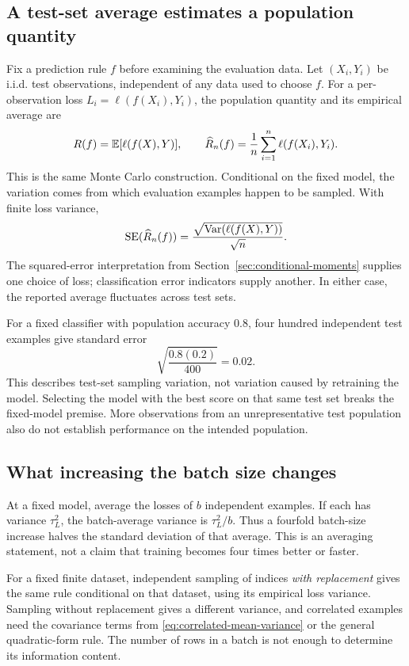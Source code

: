 \subsection{A test-set average estimates a population quantity}

Fix a prediction rule \(f\) before examining the evaluation data.
Let \((X_i,Y_i)\) be i.i.d. test observations, independent of any
data used to choose \(f\). For a per-observation loss
\(L_i=\ell(f(X_i),Y_i)\), the population quantity and its empirical
average are
\[
  R(f)=\mathbb{E}[\ell(f(X),Y)],\qquad
  \widehat R_n(f)=\frac1n\sum_{i=1}^n\ell(f(X_i),Y_i).
\]
This is the same Monte Carlo construction. Conditional on the fixed
model, the variation comes from which evaluation examples happen to
be sampled. With finite loss variance,
\[
  \operatorname{SE}(\widehat R_n(f))
  =\frac{\sqrt{\operatorname{Var}(\ell(f(X),Y))}}{\sqrt n}.
\]
The squared-error interpretation from
Section~\ref{sec:conditional-moments} supplies one choice of loss;
classification error indicators supply another. In either case, the
reported average fluctuates across test sets.

For a fixed classifier with population accuracy \(0.8\), four hundred
independent test examples give standard error
\[
  \sqrt{\frac{0.8(0.2)}{400}}=0.02.
\]
This describes test-set sampling variation,
not variation caused by retraining the model. Selecting the model
with the best score on that same test set breaks the fixed-model
premise. More observations from an unrepresentative test population
also do not establish performance on the intended population.

\subsection{What increasing the batch size changes}

At a fixed model, average the losses of \(b\) independent examples.
If each has variance \(\tau_L^2\), the batch-average variance is
\(\tau_L^2/b\). Thus a fourfold batch-size increase halves the
standard deviation of that average. This is an averaging statement,
not a claim that training becomes four times better or faster.

For a fixed finite dataset, independent sampling of indices
\emph{with replacement} gives the same rule conditional on that
dataset, using its empirical loss variance. Sampling without
replacement gives a different variance, and correlated examples need
the covariance terms from \eqref{eq:correlated-mean-variance} or the
general quadratic-form rule. The number of rows in a batch is not
enough to determine its information content.

\endgroup
